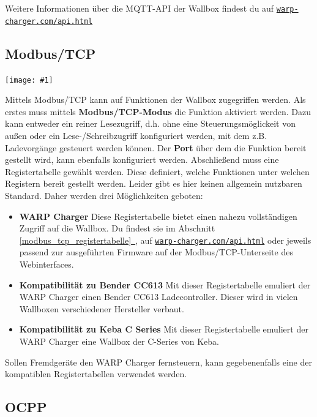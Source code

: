 \documentclass[a4paper,10pt]{article}
\newcommand{\gfx}[1]{\texttt{[image: \#1]}}
\newcommand*{\fullref}[1]{Abschnitt \hyperref[{#1}]{\ref*{#1}~\nameref*{#1}}}
\newcommand\rurl[2]{%
  \href{#1}{\nolinkurl{#2}}%
}
\begin{document}
\begin{multicols*}{2}
    Weitere Informationen über die MQTT-API der Wallbox findest du auf \rurl{https://warp-charger.com/api.html}{warp-charger.com/api.html}

    \subsection{Modbus/TCP}

    \gfx{./img_warp2/resized/web_modbus_tcp}

    Mittels Modbus/TCP kann auf Funktionen der Wallbox zugegriffen werden.
    Als erstes muss mittels \textbf{Modbus/TCP-Modus} die Funktion aktiviert
    werden. Dazu kann entweder ein reiner Lesezugriff, d.h. ohne eine
    Steuerungsmöglickeit von außen oder ein Lese-/Schreibzugriff
    konfiguriert werden, mit dem z.B. Ladevorgänge gesteuert werden können.
    Der \textbf{Port} über dem die Funktion bereit gestellt
    wird, kann ebenfalls konfiguriert werden. Abschließend muss eine
    Registertabelle gewählt werden. Diese definiert, welche Funktionen unter
    welchen Registern bereit gestellt werden. Leider gibt es hier keinen
    allgemein nutzbaren Standard. Daher werden drei Möglichkeiten geboten:

    \begin{itemize}
        \item \textbf{WARP Charger} Diese Registertabelle bietet einen nahezu vollständigen Zugriff auf die Wallbox.
                Du findest sie im \fullref{modbus_tcp_registertabelle}, auf \rurl{https://warp-charger.com/api.html}{warp-charger.com/api.html} oder
                jeweils passend zur ausgeführten Firmware auf der Modbus/TCP-Unterseite des Webinterfaces.
        \item \textbf{Kompatibilität zu Bender CC613} Mit dieser Registertabelle emuliert der WARP Charger einen Bender CC613 Ladecontroller. Dieser wird in vielen Wallboxen verschiedener Hersteller verbaut.
        \item \textbf{Kompatibilität zu Keba C Series} Mit dieser Registertabelle emuliert der WARP Charger eine Wallbox der C-Series von Keba.
    \end{itemize}

    Sollen Fremdgeräte den WARP Charger fernsteuern, kann gegebenenfalls eine der
    kompatiblen Registertabellen verwendet werden.

    \subsection{OCPP}


\end{multicols*}
\end{document}
